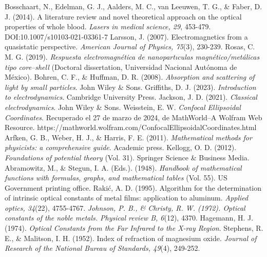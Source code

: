 \documentclass[paper=letter,8.5pt]{article}
\begin{document}
\begin{thebibliography}{99}
 Bosschaart, N., Edelman, G. J., Aalders, M. C., van Leeuwen, T. G., \& Faber, D. J. (2014). A literature review and novel theoretical approach on the optical properties of whole blood.\textit{ Lasers in medical science, 29}, 453-479. DOI:10.1007/s10103-021-03361-7
 Larsson, J. (2007). Electromagnetics from a quasistatic perspective. \textit{American Journal of Physics, 75}(3), 230-239.
 Rosas, C. M. G. (2019). \textit{Respuesta electromagnética de nanopartıculas magnético/metálicas tipo core–shell} (Doctoral dissertation, Universidad Nacional Autónoma de México).
 Bohren, C. F., \& Huffman, D. R. (2008). \textit{Absorption and scattering of light by small particles}. John Wiley \& Sons.
Griffiths, D. J. (2023). \textit{Introduction to electrodynamics}. Cambridge University Press.
 Jackson, J. D. (2021). \textit{Classical electrodynamics}. John Wiley \& Sons.
 Weisstein, E. W. \textit{Confocal Ellipsoidal Coordinates}. Recuperado el 27 de marzo de 2024, de MathWorld--A Wolfram Web Resource. https://mathworld.wolfram.com/ConfocalEllipsoidalCoordinates.html
 Arfken, G. B., Weber, H. J., \& Harris, F. E. (2011). \textit{Mathematical methods for physicists: a comprehensive guide}. Academic press.
 Kellogg, O. D. (2012). \textit{Foundations of potential theory} (Vol. 31). Springer Science \& Business Media.
 Abramowitz, M., \& Stegun, I. A. (Eds.). (1948). \textit{Handbook of mathematical functions with formulas, graphs, and mathematical tables} (Vol. 55). US Government printing office.
 Rakić, A. D. (1995). Algorithm for the determination of intrinsic optical constants of metal films: application to aluminum. \textit{Applied optics, 34}(22), 4755-4767.
 \textit{Johnson, P. B., \& Christy, R. W. (1972). Optical constants of the noble metals. Physical review B, 6}(12), 4370.
 Hagemann, H. J. (1974). \textit{Optical Constants from the Far Infrared to the X-ray Region}.
 Stephens, R. E., & Malitson, I. H. (1952). Index of refraction of magnesium oxide. \textit{Journal of Research of the National Bureau of Standards, 49}(4), 249-252.
\end{thebibliography}

\end{document}
